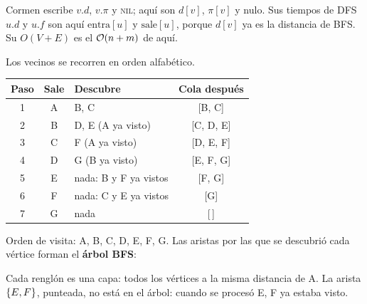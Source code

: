 \documentclass[11pt,letterpaper]{article}
\begin{document}
\begin{observacion}
  Cormen escribe $v.d$, $v.\pi$ y \textsc{nil}; aquí son $d[v]$,
  $\pi[v]$ y nulo. Sus tiempos de DFS $u.d$ y $u.f$ son aquí
  $\text{entra}[u]$ y $\text{sale}[u]$, porque $d[v]$ ya es la
  distancia de BFS. Su $O(V + E)$ es el $\mathcal{O}\!\left(n + m\right)$ de aquí.
\end{observacion}

\begin{ejemplo}
  Los vecinos se recorren en orden alfabético.
  \begin{center}
  \small
  \begin{tabular}{cclc}
    \toprule
    \textbf{Paso} & \textbf{Sale} & \textbf{Descubre}
      & \textbf{Cola después} \\
    \midrule
    1 & A & B, C & [B, C] \\
    2 & B & D, E (A ya visto) & [C, D, E] \\
    3 & C & F (A ya visto) & [D, E, F] \\
    4 & D & G (B ya visto) & [E, F, G] \\
    5 & E & nada: B y F ya vistos & [F, G] \\
    6 & F & nada: C y E ya vistos & [G] \\
    7 & G & nada & [\,] \\
    \bottomrule
  \end{tabular}
  \end{center}
  Orden de visita: A, B, C, D, E, F, G. Las aristas por las que se
  descubrió cada vértice forman el \textbf{árbol BFS}:
  \begin{center}
  \end{center}
  Cada renglón es una capa: todos los vértices a la misma distancia de
  A. La arista $\left\{ E, F \right\}$, punteada, no está en el árbol: cuando se
  procesó E, F ya estaba visto.
\end{ejemplo}
\end{document}
